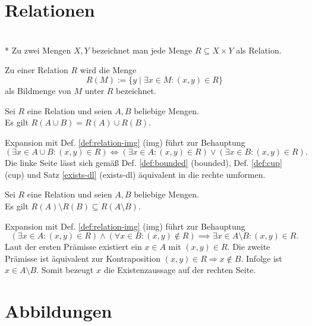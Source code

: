 \section{Relationen}
\begin{Definition}\mbox{}\\*
Zu zwei Mengen $X,Y$ bezeichnet man
jede Menge $R\subseteq X\times Y$ als Relation.
\end{Definition}
\begin{Definition}\label{def:relation-img}
Zu einer Relation $R$ wird die Menge
\[R(M) := \{y\mid\exists x\in M\colon (x,y)\in R\}\]
als Bildmenge von $M$ unter $R$ bezeichnet.
\end{Definition}

\begin{Korollar}
Sei $R$ eine Relation und seien $A,B$ beliebige Mengen.\\
Es gilt $R(A\cup B) = R(A)\cup R(B)$.
\end{Korollar}
\begin{Beweis}
Expansion mit Def. \ref{def:relation-img} (img) führt zur Behauptung
\[(\exists x\in A\cup B\colon (x,y)\in R) \iff (\exists x\in A\colon (x,y)\in R)
\lor (\exists x\in B\colon (x,y)\in R).\]
Die linke Seite lässt sich gemäß Def. \ref{def:bounded} (bounded),
Def. \ref{def:cup} (cup) und Satz \ref{exists-dl} (exists-dl)
äquivalent in die rechte umformen.\;\qedsymbol
\end{Beweis}

\begin{Korollar}
Sei $R$ eine Relation und seien $A,B$ beliebige Mengen.\\
Es gilt $R(A)\setminus R(B)\subseteq R(A\setminus B)$.
\end{Korollar}
\begin{Beweis}
Expansion mit Def. \ref{def:relation-img} (img) führt zur Behauptung
\[(\exists x\in A\colon (x,y)\in R)\land (\forall x\in B\colon (x,y)\notin R)
\implies \exists x\in A\setminus B\colon (x,y)\in R.\]
Laut der ersten Prämisse existiert ein $x\in A$ mit $(x,y)\in R$. Die
zweite Prämisse ist äquivalent zur Kontraposition $(x,y)\in R\Rightarrow x\notin B$.
Infolge ist $x\in A\setminus B$. Somit bezeugt $x$ die
Existenzaussage auf der rechten Seite.\,\qedsymbol
\end{Beweis}

\newpage
\section{Abbildungen}
